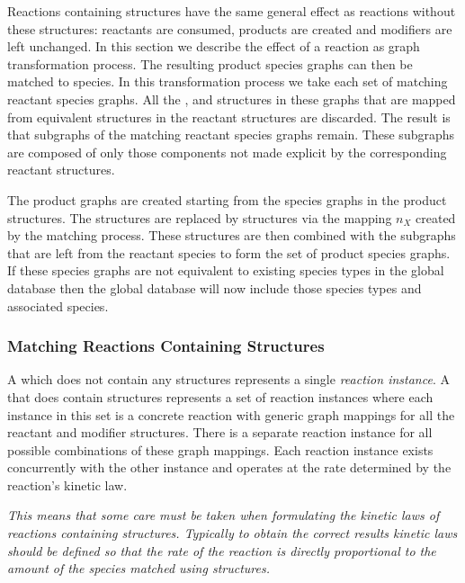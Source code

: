 \documentclass{cekarticle}
\begin{document}
Reactions containing  structures have the same
general effect as reactions without these structures: reactants
are consumed, products are created and modifiers are left
unchanged. In this section we describe the effect of a reaction as
graph transformation process. The resulting product species graphs
can then be matched to species. In this transformation process we
take each set of matching reactant species graphs. All the
,  and
 structures in these graphs that are mapped
from equivalent structures in the reactant
 structures are discarded. The result is
that subgraphs of the matching reactant species graphs remain.
These subgraphs are composed of only those components not made
explicit by the corresponding reactant 
structures.

The product graphs are created starting from the species graphs in
the product  structures.  The
 structures are replaced by
 structures via the mapping $n_{X}$ created by
the matching process. These structures are then combined with the
subgraphs that are left from the reactant species to form the set
of product species graphs. If these species graphs are not
equivalent to existing species types in the global database then
the global database will now include those species types and
associated species.

\subsubsection{Matching Reactions Containing  Structures}

A  which does not contain any 
structures represents a single \emph{reaction instance}.  A
 that does contain  structures
represents a set of reaction instances where each instance in this
set is a concrete reaction with generic graph mappings for all the
reactant and modifier  structures.
There is a separate reaction instance for all possible
combinations of these graph mappings. Each reaction instance
exists concurrently with the other instance and operates at the
rate determined by the reaction's kinetic law.

\emph{This means that some care must be taken when formulating the
kinetic laws of reactions containing 
structures.  Typically to obtain the correct results kinetic laws
should be defined so that the rate of the reaction is directly
proportional to the amount of the species matched using
 structures.}
\end{document}
